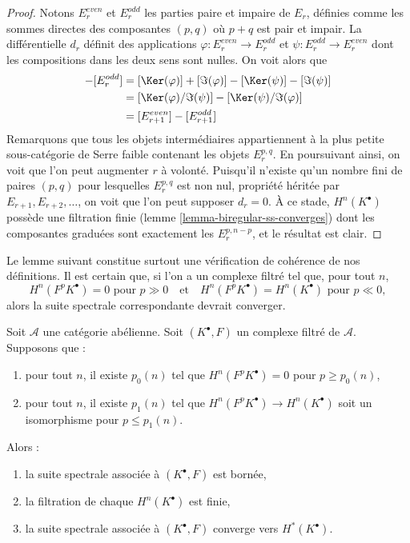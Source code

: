 \begin{proof}
Notons $E_r^{even}$ et $E_r^{odd}$ les parties paire et impaire de $E_r$,
définies comme les sommes directes des composantes $(p, q)$ où $p + q$ est pair
et impair. La différentielle $d_r$ définit des applications
$\varphi : E_r^{even} \to E_r^{odd}$ et $\psi : E_r^{odd} \to E_r^{even}$
dont les compositions dans les deux sens sont nulles.
On voit alors que
\begin{align*}
[E_r^{even}] - [E_r^{odd}] & =
[\Ker(\varphi)] + [\Im(\varphi)] - [\Ker(\psi)] - [\Im(\psi)] \\
& =
[\Ker(\varphi)/\Im(\psi)] - [\Ker(\psi)/\Im(\varphi)] \\
& =
[E_{r + 1}^{even}] - [E_{r + 1}^{odd}]
\end{align*}
Remarquons que tous les objets intermédiaires appartiennent à la plus petite sous-catégorie de Serre faible
contenant les objets $E_r^{p, q}$.
En poursuivant ainsi, on voit que l'on peut augmenter $r$ à volonté.
Puisqu'il n'existe qu'un nombre fini de paires $(p, q)$ pour lesquelles
$E_r^{p, q}$ est non nul, propriété héritée par
$E_{r + 1}, E_{r + 2}, \ldots$, on voit que l'on peut supposer $d_r = 0$.
À ce stade, $H^n(K^\bullet)$ possède une filtration finie
(lemme \ref{lemma-biregular-ss-converges}) dont les composantes graduées
sont exactement les $E_r^{p, n - p}$, et le résultat est clair.
\end{proof}

\noindent
Le lemme suivant constitue surtout une vérification de cohérence de nos définitions.
Il est certain que, si l'on a un complexe filtré tel que, pour tout $n$,
$$
H^n(F^pK^\bullet) = 0\text{ pour }p \gg 0
\quad\text{et}\quad
H^n(F^pK^\bullet) = H^n(K^\bullet)\text{ pour }p \ll 0,
$$
alors la suite spectrale correspondante devrait converger.

\begin{lemma}
\label{lemma-ss-converges-trivial}
Soit $\mathcal{A}$ une catégorie abélienne. Soit $(K^\bullet, F)$ un
complexe filtré de $\mathcal{A}$. Supposons que :
\begin{enumerate}
\item pour tout $n$, il existe $p_0(n)$ tel que
$H^n(F^pK^\bullet) = 0$ pour $p \geq p_0(n)$,
\item pour tout $n$, il existe $p_1(n)$ tel que
$H^n(F^pK^\bullet) \to H^n(K^\bullet)$ soit un isomorphisme
pour $p \leq p_1(n)$.
\end{enumerate}
Alors :
\begin{enumerate}
\item la suite spectrale associée à $(K^\bullet, F)$ est bornée,
\item la filtration de chaque $H^n(K^\bullet)$ est finie,
\item la suite spectrale associée à $(K^\bullet, F)$ converge
vers $H^*(K^\bullet)$.
\end{enumerate}
\end{lemma}

